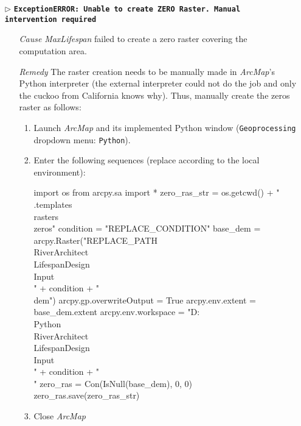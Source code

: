 \begin{itemize}
	\item[$\triangleright$]\textbf{\texttt{ExceptionERROR: Unable to create ZERO Raster. Manual intervention required}}
	\begin{itemize}
		\item[\textit{Cause}\hspace{0.27cm}] \textit{MaxLifespan} failed to create a zero raster covering the computation area.
		\item[\textit{Remedy}] The raster creation needs to be manually made in \textit{ArcMap}'s Python interpreter (the external interpreter could not do the job and only the cuckoo from
California knows why). Thus, manually create the zeros raster as follows:
		\begin{enumerate}
			\item Launch \textit{ArcMap} and its implemented Python window (\texttt{Geoprocessing} dropdown menu: \texttt{Python}).
			\item Enter the following sequences (replace  according to the local environment):
\begin{python}
import os
from arcpy.sa import *
zero_ras_str = os.getcwd() + "\\.templates\\rasters\\zeros"
condition = "REPLACE_CONDITION"
base_dem = arcpy.Raster("REPLACE_PATH\\RiverArchitect\\LifespanDesign\\Input\\" + condition + "\\dem")
arcpy.gp.overwriteOutput = True
arcpy.env.extent = base_dem.extent
arcpy.env.workspace = "D:\\Python\\RiverArchitect\\LifespanDesign\\Input\\" + condition + "\\"
zero_ras = Con(IsNull(base_dem), 0, 0)
zero_ras.save(zero_ras_str)
\end{python}
			\item Close \textit{ArcMap}
		\end{enumerate}
	\end{itemize}
	

\end{itemize}
